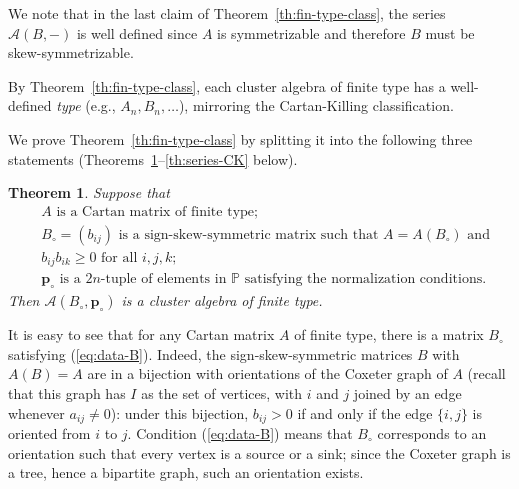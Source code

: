 \documentclass[letterpaper]{amsart}
\numberwithin{equation}{section}
\newtheorem{theorem}{Theorem}[section]
\theoremstyle{definition}
\def\AA{\mathcal{A}}
\def\PP{\mathbb{P}}
\def\pp{\mathbf{p}}
\begin{document}
We note that in the last claim of Theorem~\ref{th:fin-type-class}, 
the series $\AA(B,-)$ is well defined since 
$A$ is symmetrizable and therefore $B$ must be skew-symmetrizable. 
 
 
By Theorem~\ref{th:fin-type-class}, each cluster 
algebra of finite type has a well-defined \emph{type} (e.g., 
$A_n,B_n,\dots$), mirroring the Cartan-Killing classification. 
 
 
We prove Theorem~\ref{th:fin-type-class} by splitting it into the 
following three statements 
(Theorems~\ref{th:finite-type-class-new}--\ref{th:series-CK} below). 
 
\begin{theorem} 
\label{th:finite-type-class-new} 
Suppose that 
\begin{align} 
\label{eq:data-A} &\text{$A$~is a Cartan matrix of finite type;} 
\\ 
\label{eq:data-B} &\text{$B_\circ=(b_{ij})$~is a sign-skew-symmetric matrix 
such that $A=A(B_\circ)$ and} 
\\ 
\nonumber &\text{$b_{ij} b_{ik} \geq 0$ for all $i,j,k$;} 
\\ \label{eq:data-pp} &\text{$\pp_\circ$~is  a 
$2n$-tuple of elements in $\PP$ satisfying the normalization 
conditions.} 
\end{align} 
Then %
$\AA(B_\circ,\pp_\circ)$ is a %
cluster algebra of finite type. 
\end{theorem} 
 
It is easy to see that for any Cartan matrix $A$ of finite type, 
there is a matrix $B_\circ$ satisfying (\ref{eq:data-B}). 
Indeed, the sign-skew-symmetric matrices $B$ with $A(B) = A$ are 
in a bijection with orientations of the Coxeter graph of $A$ 
(recall that this graph has $I$ as the set of vertices, with 
$i$ and $j$ joined by an edge whenever $a_{ij} \neq 0$): 
under this bijection, $b_{ij} > 0$ if and only if the edge 
$\{i,j\}$ is oriented from $i$ to $j$. 
Condition (\ref{eq:data-B}) means that $B_\circ$ corresponds to an 
orientation such that every vertex is a source or a sink; since 
the Coxeter graph is a tree, hence a bipartite graph, such an 
orientation exists. 
 
\end{document}
